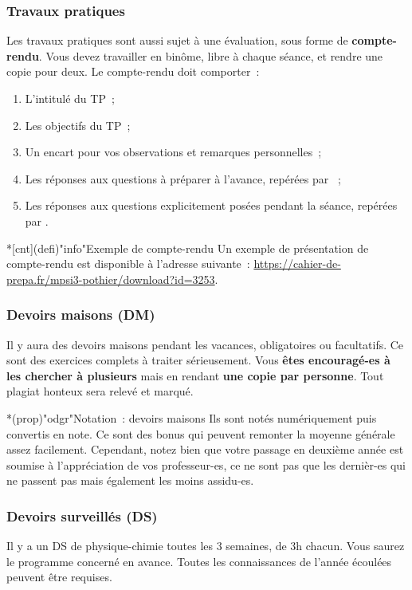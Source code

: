 \documentclass[a4paper, 10pt, garamond]{book}
\begin{document}
\subsubsection{Travaux pratiques}
Les travaux pratiques sont aussi sujet à une évaluation, sous forme de
\textbf{compte-rendu}. Vous devez travailler en binôme, libre à chaque séance,
et rendre une copie pour deux. Le compte-rendu doit comporter~:
\begin{enumerate}
	\item L'intitulé du TP~;
	\item Les objectifs du TP~;
	\item Un encart pour vos observations et remarques personnelles~;
	\item Les réponses aux questions à préparer à l'avance,
	      repérées par ~;
	\item Les réponses aux questions explicitement posées pendant la
	      séance, repérées par .
\end{enumerate}

\begin{tcn}*[cnt](defi)"info"{Exemple de compte-rendu}
	Un exemple de présentation de compte-rendu est disponible à l'adresse
	suivante~: \url{https://cahier-de-prepa.fr/mpsi3-pothier/download?id=3253}.
\end{tcn}

\subsubsection{Devoirs maisons (DM)}
Il y aura des devoirs maisons pendant les vacances, obligatoires ou facultatifs.
Ce sont des exercices complets à traiter sérieusement. Vous \textbf{êtes
	encouragé-es à les chercher à plusieurs} mais en rendant \textbf{une copie par
	personne}. Tout plagiat honteux sera relevé et marqué.

\begin{tcn}*(prop)"odgr"{Notation~: devoirs maisons}
	Ils sont notés numériquement puis convertis en note. Ce sont des bonus qui
	peuvent remonter la moyenne générale assez facilement. Cependant, notez bien
	que votre passage en deuxième année est soumise à l'appréciation de vos
	professeur-es, ce ne sont pas que les dernièr-es qui ne passent pas mais
	également les moins assidu-es.
\end{tcn}

\subsubsection{Devoirs surveillés (DS)}
Il y a un DS de physique-chimie toutes les 3 semaines, de 3h chacun. Vous saurez
le programme concerné en avance. Toutes les connaissances de l'année écoulées
peuvent être requises.
\end{document}
